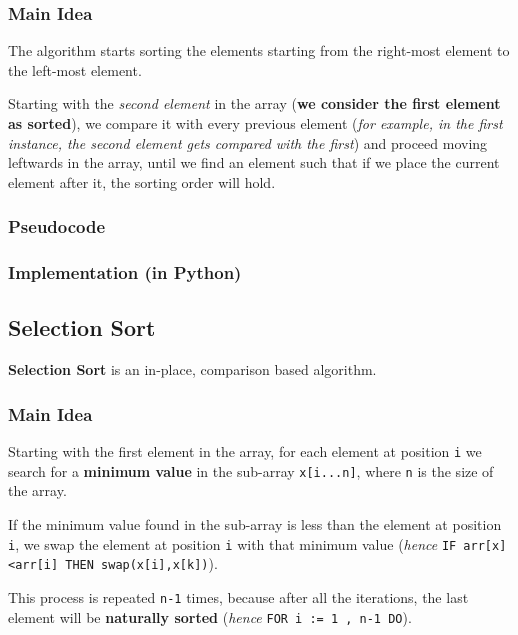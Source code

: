 \documentclass[a4paper]{article}
\begin{document}
                \subsubsection*{Main Idea}
                The algorithm starts sorting the elements starting 
                from the right-most element to the left-most element.

                Starting with the \textit{second 
                element} in the array (\textbf{we consider
                the first element as sorted}), we
                compare it with every previous element
                (\textit{for example, in the first instance, the second element gets
                compared with the first}) and
                proceed moving leftwards in the array, until we
                find an element such that if we place the current element
                after it, the sorting order will hold.
                \subsubsection*{Pseudocode}
                \subsubsection*{Implementation (in Python)}
            
            \subsection{Selection Sort}
                \textbf{Selection Sort} is an in-place, comparison based algorithm.
                \subsubsection*{Main Idea}
                Starting with the first element in the array, for each element at position
                \verb|i| we search for a \textbf{minimum value} in the sub-array
                \verb|x[i...n]|, where \verb|n| is the size of the array.

                If the minimum value found in the sub-array is less than the
                element at position \verb|i|, we swap the element at position \verb|i|
                with that minimum value
                (\textit{hence} \verb|IF arr[x]<arr[i] THEN swap(x[i],x[k])|).

                This process is repeated \verb|n-1| times, because after all
                the iterations, the last element will be \textbf{naturally sorted}
                (\textit{hence} \verb|FOR i := 1 , n-1 DO|).
\end{document}
